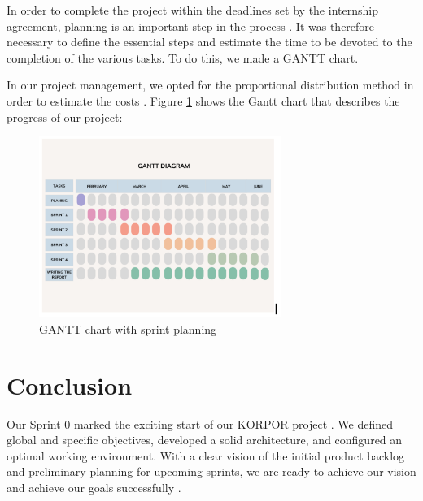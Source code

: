 In order to complete the project within the deadlines set by the internship agreement, planning is an important step in the process \cite{SutherlandScrum2020, RubinEssentialScrum2012}. It was therefore necessary to define the essential steps and estimate the time to be devoted to the completion of the various tasks. To do this, we made a GANTT chart.

In our project management, we opted for the proportional distribution method in order to estimate the costs \cite{CohnAgileEstimating2005, GreningPlanningPoker2002}.
Figure \ref{fig:gantt-chart} shows the Gantt chart that describes the progress of our project:

\vspace{1cm}
\newpage

\begin{figure}[htbp]
    \centering
    \includegraphics[width=0.7\textwidth]{images/gantt-chart.png}
    \caption{GANTT chart with sprint planning}
    \label{fig:gantt-chart}
\end{figure}


\section*{Conclusion}

Our Sprint 0 marked the exciting start of our KORPOR project \cite{ScaledAgileFramework2024, SutherlandScrum2020}. We defined global and specific objectives, developed a solid architecture, and configured an optimal working environment. With a clear vision of the initial product backlog and preliminary planning for upcoming sprints, we are ready to achieve our vision and achieve our goals successfully \cite{SchwarzScrum2019, RubinEssentialScrum2012}.

